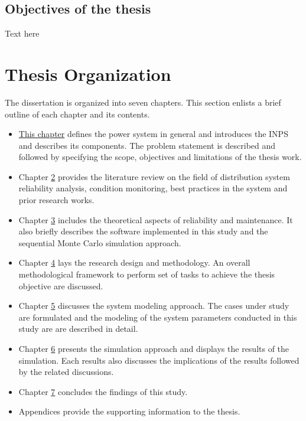 \subsection{Objectives of the thesis}
Text here



\section{Thesis Organization}

The dissertation is organized into seven chapters. This section enlists a brief outline of each chapter and its contents. \begin{itemize}
    \item \hyperref[chapter1]{This chapter} defines the power system in general and introduces the INPS and describes its components. The problem statement is described and followed by specifying the scope, objectives and limitations of the thesis work.
    
    \item Chapter \hyperref[chapter2]{2} provides the literature review on the field of distribution system  reliability analysis, condition monitoring, best practices in the system and prior research works.
    
    \item Chapter \hyperref[chapter3]{3} includes the theoretical aspects of reliability and maintenance. It also briefly describes the software implemented in this study and the sequential Monte Carlo simulation approach.
    
   \item Chapter \hyperref[chapter4]{4} lays the research design and methodology. An overall methodological framework to perform set of tasks to achieve the thesis objective are discussed.
    
    \item Chapter \hyperref[chapter5]{5} discusses the system modeling approach. The cases under study are formulated and the modeling of the system parameters conducted in this study are are described in detail.
    
    \item Chapter \hyperref[chapter6]{6} presents the simulation approach and displays the results of the simulation. Each results also discusses the implications of the results followed by the related discussions.
    
    \item Chapter \hyperref[chapter7]{7} concludes the findings of this study.
    
    \item Appendices provide the supporting information to the thesis. 

\end{itemize}
